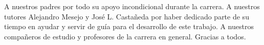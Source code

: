 \begin{acknowledgements}
    A nuestros padres por todo su apoyo incondicional durante la carrera.
    A nuestros tutores Alejandro Mesejo y José L. Castañeda por haber dedicado parte de su tiempo en ayudar y servir de guía para el desarrollo de este trabajo. 
    A nuestros compañeros de estudio y profesores de la carrera en general. Gracias a todos.
\end{acknowledgements}